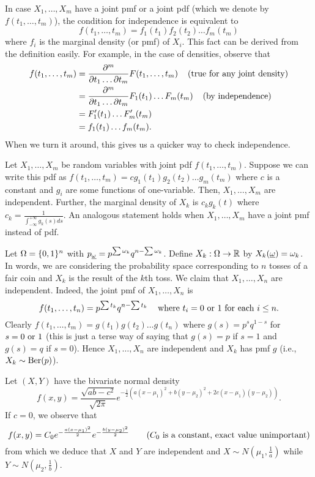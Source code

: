 \documentclass[preprint,  11pt]{amsart}
\def\omeg{\underline{\ome}}
\begin{document}
\berk In case $X_{1},\ldots ,X_{m}$ have a joint pmf or a joint pdf (which we denote by $f(t_{1},\ldots ,t_{m})$), the condition for independence is equivalent to 
$$
f(t_{1},\ldots ,t_{m})=f_{1}(t_{1})f_{2}(t_{2})\ldots f_{m}(t_{m})
$$ 
where $f_{i}$ is the marginal density (or pmf)  of $X_{i}$. This fact can be derived from the definition easily. For example, in the case of densities, observe that 
\begin{align*}
f(t_{1},\ldots ,t_{m}) &= \frac{\partial^{m}}{\partial t_{1}\ldots \partial t_{m}}F(t_{1},\ldots,t_{m}) \hsp{4mm}(\mb{true for any joint density})\\
 &= \frac{\partial^{m}}{\partial t_{1}\ldots \partial t_{m}}F_{1}(t_{1})\ldots F_{m}(t_{m}) \hsp{4mm}(\mb{by independence}) \\
 &= F_{1}'(t_{1})\ldots F_{m}'(t_{m}) \\
 &=f_{1}(t_{1})\ldots f_{m}(t_{m}).
\end{align*}
\eerk
When we turn it around, this gives us a quicker way to check independence.

 Let $X_{1},\ldots ,X_{m}$ be random variables with joint pdf $f(t_{1},\ldots ,t_{m})$. Suppose we can write this pdf as $f(t_{1},\ldots ,t_{m})=cg_{1}(t_{1})g_{2}(t_{2})\ldots g_{m}(t_{m})$ where $c$ is a constant and $g_{i}$ are some functions of one-variable. Then,  $X_{1},\ldots ,X_{m}$ are independent. Further, the marginal density of $X_{k}$ is $c_{k}g_{k}(t)$ where $c_{k}=\frac{1}{\int_{-\infty}^{+\infty}g_{k}(s)ds}$. An analogous statement holds when $X_{1},\ldots ,X_{m}$ have a joint pmf instead of pdf.



\beg Let $\Ome=\{0,1\}^{n}$ with $p_{\omeg}=p^{\sum \ome_{k}}q^{n-\sum \ome_{k}}$. Define $X_{k}:\Ome\to \R$ by $X_{k}(\omeg)=\ome_{k}$. In words, we are considering the probability space corresponding to $n$ tosses of a fair coin and $X_{k}$ is the result of the $k$th toss. We claim that $X_{1},\ldots ,X_{n}$ are independent. Indeed, the joint pmf of $X_{1},\ldots ,X_{n}$ is 
$$
f(t_{1},\ldots ,t_{n})=p^{\sum t_{k}}q^{n-\sum t_{k}} \hsp{3mm} \mb{ where }t_{i}=0\mb{ or }1 \mb{ for each }i\le n.
$$
Clearly $f(t_{1},\ldots ,t_{m})=g(t_{1})g(t_{2})\ldots g(t_{n})$ where $g(s)=p^{s}q^{1-s}$ for $s=0\mb{ or }1$ (this is just a terse way of saying that $g(s)=p$ if $s=1$ and $g(s)=q$ if $s=0$). Hence $X_{1},\ldots ,X_{n}$ are independent and $X_{k}$ has pmf $g$ (i.e., $X_{k}\sim \mb{Ber}(p)$).
\eeg

\beg Let $(X,Y)$ have the bivariate normal density 
$$
f(x,y)=\frac{\sqrt{ab-c^{2}}}{\sqrt{2\pi}}e^{-\frac{1}{2}(a(x-\mu_{1})^{2}+b(y-\mu_{2})^{2}+2c(x-\mu_{1})(y-\mu_{2}))}.
$$
If $c=0$, we observe that 
$$
f(x,y) = C_{0} e^{-\frac{a(x-\mu_{1})^{2}}{2}}e^{-\frac{b(y-\mu_{2})^{2}}{2}} \qquad (C_{0}\mb{ is a constant, exact value unimportant})
$$
from which we deduce that $X$ and $Y$ are independent and $X\sim N(\mu_{1},\frac{1}{a})$ while $Y\sim N(\mu_{2},\frac{1}{b})$.
\end{document}
